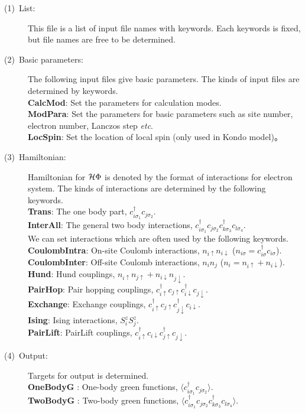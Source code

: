 \begin{description}
\item[(1)~List:] This file is a list of input file names with keywords. Each keywords is fixed, but file names are free to be determined.  
\item[(2)~Basic parameters:] The following input files give basic parameters. 
The kinds of input files are determined by keywords. 
~\\{\bf CalcMod}: Set the parameters for calculation modes.
~\\{\bf ModPara}: Set the parameters for basic parameters such as site number, electron number, Lanczos step {\it etc}.
~\\{\bf LocSpin}: Set the location of local spin (only used in Kondo model)。
\item[(3)~Hamiltonian:] 
Hamiltonian for $\mathcal{H} \Phi$ is denoted by the format of interactions for electron system. 
The kinds of interactions are determined by the following keywords. 
~\\{\bf Trans}: The one body part, $c_{i\sigma_1}^{\dag}c_{j\sigma_2}$.
~\\{\bf InterAll}: The general two body interactions, $c_ {i \sigma_1}^{\dag}c_{j\sigma_2}c_{k \sigma_3}^{\dag}c_{l \sigma_4}$.
~\\We can set interactions which are often used by the following keywords. 
~\\{\bf CoulombIntra}: On-site Coulomb interactions, $n_ {i \uparrow}n_{i \downarrow}$ ($n_{i \sigma}=c_{i\sigma}^{\dag}c_{i\sigma}$).
~\\{\bf CoulombInter}: Off-site Coulomb interactions, $n_ {i}n_{j}$ ($n_i=n_{i\uparrow}+n_{i\downarrow}$).
~\\{\bf Hund}: Hund couplings, $n_{i\uparrow}n_{j\uparrow}+n_{i\downarrow}n_{j\downarrow}$.
~\\{\bf PairHop}: Pair hopping couplings, $c_ {i \uparrow}^{\dag}c_{j\uparrow}c_{i \downarrow}^{\dag}c_{j  \downarrow}$.
~\\{\bf Exchange}: Exchange couplings, $c_ {i \uparrow}^{\dag}c_{j\uparrow}c_{j \downarrow}^{\dag}c_{i  \downarrow}$.
~\\{\bf Ising}: Ising interactions, $S_i^z S_j^z$.
~\\{\bf PairLift}: PairLift couplings, $c_ {i \uparrow}^{\dag}c_{i\downarrow}c_{j \uparrow}^{\dag}c_{j \downarrow}$.
\item[(4)~Output:] Targets for output is determined.
~\\{\bf OneBodyG }: One-body green functions,  $\langle c^{\dagger}_{i\sigma_1}c_{j\sigma_2}\rangle$.
~\\{\bf TwoBodyG }: Two-body green functions,  $\langle c^{\dagger}_{i\sigma_1}c_{j\sigma_2}c^{\dagger}_{k \sigma_3}c_{l\sigma_4}\rangle$.
\end{description}


